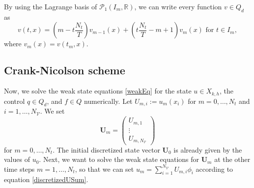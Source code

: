 By using the Lagrange basis of $\mathcal{P}_1(I_m,\mathbb{R})$, we can write every function $v \in Q_d$ as
\begin{displaymath}
v(t,x)=\left(m-t\frac{N_t}{T}\right) v_{m-1}(x)+\left(t\frac{N_t}{T}-m+1\right) v_m(x)\text{ for }t\in I_m,
\end{displaymath}
where $v_m(x)=v(t_m,x)$.


\subsection{Crank-Nicolson scheme}
Now, we solve the weak state equations \eqref{weakEq} for the state $u\in X_{k,h}$, the control $q\in Q_d$, and $f\in Q$ numerically. Let $U_{m,i}:=u_m(x_i)$ for $m=0,\dotsc,N_t$ and $i=1,\dotsc,N_\mathcal{V}$. We set
\begin{displaymath}
\mathbf{U}_m=\begin{pmatrix} U_{m,1} \\ \vdots \\ U_{m,N_\mathcal{V}} \end{pmatrix}
\end{displaymath}
for $m=0,\dotsc,N_t$. The initial discretized state vector $\mathbf{U}_0$ is already given by the values of $u_0$. Next, we want to solve the weak state equations for $\mathbf{U}_m$ at the other time steps $m=1,\dotsc,N_t$, so that we can set $u_m=\sum_{i=1}^{N_\mathcal{V}}U_{m,i}\phi_i$ according to equation \eqref{discretizedUSum}.

